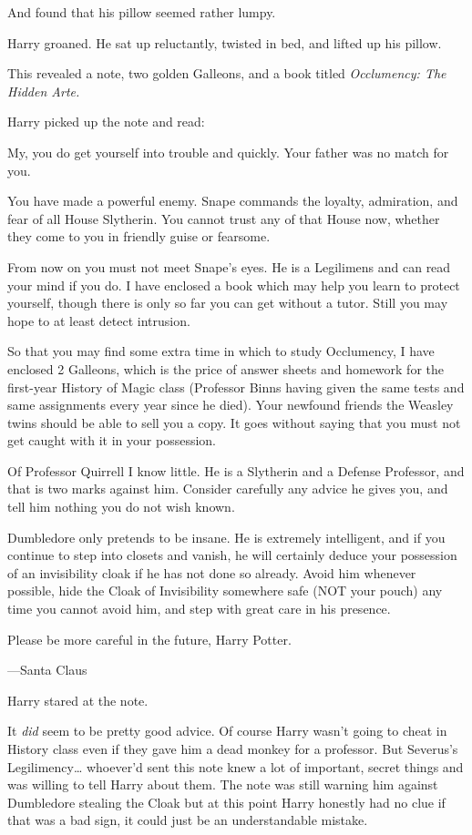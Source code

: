 And found that his pillow seemed rather lumpy.

Harry groaned. He sat up reluctantly, twisted in bed, and lifted up his pillow.

This revealed a note, two golden Galleons, and a book titled \emph{Occlumency:
The Hidden Arte.}

Harry picked up the note and read:

\begin{writtenNote}
My, you do get yourself into trouble and quickly. Your father was no
match for you.

You have made a powerful enemy. Snape commands the loyalty, admiration,
and fear of all House Slytherin. You cannot trust any of that House now,
whether they come to you in friendly guise or fearsome.

From now on you must not meet Snape's eyes. He is a Legilimens and can
read your mind if you do. I have enclosed a book which may help you learn to
protect yourself, though there is only so far you can get without a tutor.
Still you may hope to at least detect intrusion.

So that you may find some extra time in which to study Occlumency, I have
enclosed 2 Galleons, which is the price of answer sheets and homework for the
first-year History of Magic class (Professor Binns having given the same tests
and same assignments every year since he died). Your newfound friends the
Weasley twins should be able to sell you a copy. It goes without saying that
you must not get caught with it in your possession.

Of Professor Quirrell I know little. He is a Slytherin and a Defense
Professor, and that is two marks against him. Consider carefully any advice he
gives you, and tell him nothing you do not wish known.

Dumbledore only pretends to be insane. He is extremely intelligent, and
if you continue to step into closets and vanish, he will certainly deduce your
possession of an invisibility cloak if he has not done so already. Avoid him
whenever possible, hide the Cloak of Invisibility somewhere safe (NOT your
pouch) any time you cannot avoid him, and step with great care in his presence.

Please be more careful in the future, Harry Potter.

---Santa Claus
\end{writtenNote}

Harry stared at the note.

It \emph{did} seem to be pretty good advice. Of course Harry wasn't going to
cheat in History class even if they gave him a dead monkey for a professor. But
Severus's Legilimency{\ldots} whoever'd sent this note knew a lot of important,
secret things and was willing to tell Harry about them. The note was still
warning him against Dumbledore stealing the Cloak but at this point Harry
honestly had no clue if that was a bad sign, it could just be an understandable
mistake.

